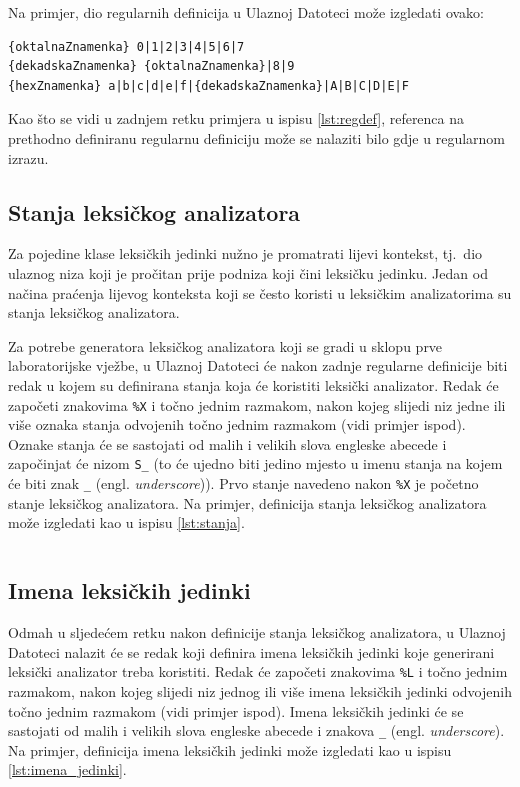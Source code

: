 \documentclass[times, 12pt, utf8]{book}
\begin{document}
Na primjer, dio regularnih definicija u Ulaznoj Datoteci može izgledati ovako:

\begin{lstlisting}[caption={Primjer regularnih definicija u Ulaznoj Datoteci.},label=lst:regdef]
{oktalnaZnamenka} 0|1|2|3|4|5|6|7
{dekadskaZnamenka} {oktalnaZnamenka}|8|9
{hexZnamenka} a|b|c|d|e|f|{dekadskaZnamenka}|A|B|C|D|E|F
\end{lstlisting}

Kao što se vidi u zadnjem retku primjera u ispisu \ref{lst:regdef}, referenca na prethodno definiranu regularnu definiciju može se nalaziti bilo gdje u regularnom izrazu.

\subsection{Stanja leksičkog analizatora}
Za pojedine klase leksičkih jedinki nužno je promatrati lijevi kontekst, tj.~dio ulaznog niza koji je pročitan prije podniza koji čini leksičku jedinku.
Jedan od načina praćenja lijevog konteksta koji se često koristi u leksičkim analizatorima su stanja leksičkog analizatora.

Za potrebe generatora leksičkog analizatora koji se gradi u sklopu prve laboratorijske vježbe, u Ulaznoj Datoteci će nakon zadnje regularne definicije biti redak u kojem su definirana stanja koja će koristiti leksički analizator.
Redak će započeti znakovima \verb=%X= i točno jednim razmakom, nakon kojeg slijedi niz jedne ili više oznaka stanja odvojenih točno jednim razmakom (vidi primjer ispod).
Oznake stanja će se sastojati od malih i velikih slova engleske abecede i započinjat će nizom \verb=S_= (to će ujedno biti jedino mjesto u imenu stanja na kojem će biti znak \verb=_= (engl. \emph{underscore})).
Prvo stanje navedeno nakon \verb=%X= je početno stanje leksičkog analizatora.
Na primjer, definicija stanja leksičkog analizatora može izgledati kao u ispisu \ref{lst:stanja}.

\begin{lstlisting}[caption={Primjer imena stanja u Ulaznoj Datoteci.},label=lst:stanja]
%X S_pocetno S_komentar S_unarniMinus
\end{lstlisting}

\subsection{Imena leksičkih jedinki}
Odmah u sljedećem retku nakon definicije stanja leksičkog analizatora, u Ulaznoj Datoteci nalazit će se redak koji definira imena leksičkih jedinki koje generirani leksički analizator treba koristiti.
Redak će započeti znakovima \verb=%L= i točno jednim razmakom, nakon kojeg slijedi niz jednog ili više imena leksičkih jedinki odvojenih točno jednim razmakom (vidi primjer ispod).
Imena leksičkih jedinki će se sastojati od malih i velikih slova engleske abecede i znakova \verb=_= (engl. \emph{underscore}).
Na primjer, definicija imena leksičkih jedinki može izgledati kao u ispisu \ref{lst:imena_jedinki}.
\end{document}
